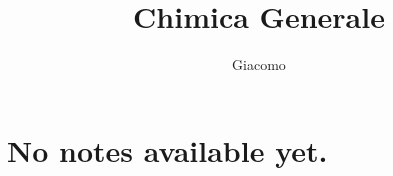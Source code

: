 \documentclass{article}
\title{Chimica Generale}
\author{Giacomo}
\begin{document}
\maketitle

\section*{No notes available yet.}
\end{document}
